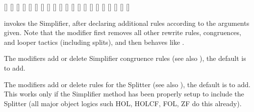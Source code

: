 \begin{isabellebody}
\begin{isamarkuptext}
  \begin{railoutput}
\rail@bar
{}[]
[]
\rail@endbar
\rail@bar
{}
[]
\rail@endbar
\rail@plus
{}
[]
\rail@endplus
\rail@end
{}
[]
\rail@bar
{}[]
[]
[]
[]
\rail@endbar
{}[]
\rail@end
{}
\rail@bar
{}[]
[]
[]
[]
\rail@bar
{}
[]
[]
\rail@endbar
{}
[]
\rail@bar
{}
[]
[]
\rail@endbar
\rail@endbar
{}[]
[]
\rail@end
\end{railoutput}


  \begin{description}

  \item \hyperlink{method.simp}{\mbox{}} invokes the Simplifier, after declaring
  additional rules according to the arguments given.  Note that the
   modifier first removes all other rewrite rules,
  congruences, and looper tactics (including splits), and then behaves
  like .

  \medskip The  modifiers add or delete Simplifier
  congruence rules (see also ), the default is
  to add.

  \medskip The  modifiers add or delete rules for the
  Splitter (see also \cite{isabelle-ref}), the default is to add.
  This works only if the Simplifier method has been properly setup to
  include the Splitter (all major object logics such HOL, HOLCF, FOL,
  ZF do this already).


\end{description}
\end{isamarkuptext}
\end{isabellebody}
